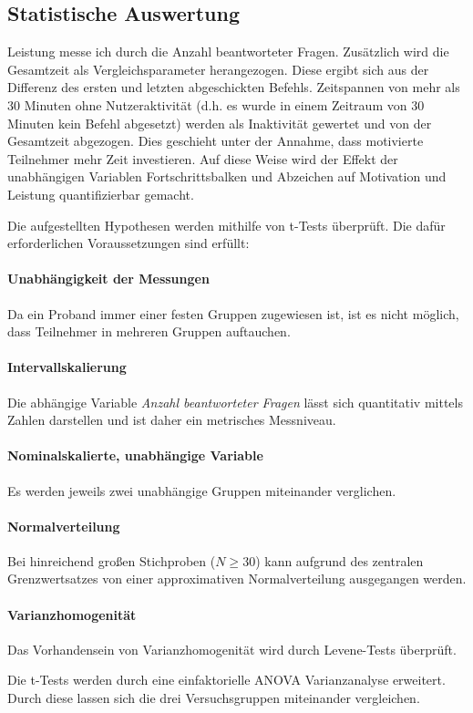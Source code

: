 \subsection{Statistische Auswertung}
Leistung messe ich durch die Anzahl beantworteter Fragen. Zusätzlich wird die Gesamtzeit als Vergleichsparameter herangezogen. Diese ergibt sich aus der Differenz des ersten und letzten abgeschickten Befehls. Zeitspannen von mehr als 30 Minuten ohne Nutzeraktivität (d.h. es wurde in einem Zeitraum von 30 Minuten kein Befehl abgesetzt) werden als Inaktivität gewertet und von der Gesamtzeit abgezogen. Dies geschieht unter der Annahme, dass motivierte Teilnehmer mehr Zeit investieren. Auf diese Weise wird der Effekt der unabhängigen Variablen Fortschrittsbalken und Abzeichen auf Motivation und Leistung quantifizierbar gemacht.

Die aufgestellten Hypothesen werden mithilfe von t-Tests überprüft. Die dafür erforderlichen Voraussetzungen sind erfüllt:

\paragraph{Unabhängigkeit der Messungen}
Da ein Proband immer einer festen Gruppen zugewiesen ist, ist es nicht möglich, dass Teilnehmer in mehreren Gruppen auftauchen.

\paragraph{Intervallskalierung}
Die abhängige Variable \textit{Anzahl beantworteter Fragen} lässt sich quantitativ mittels Zahlen darstellen und ist daher ein metrisches Messniveau.

\paragraph{Nominalskalierte, unabhängige Variable}
Es werden jeweils zwei unabhängige Gruppen miteinander verglichen.

\paragraph{Normalverteilung}
Bei  hinreichend  großen  Stichproben ($N \geq 30$)  kann  aufgrund  des  zentralen  Grenzwertsatzes  von  einer  approximativen Normalverteilung ausgegangen werden.

\paragraph{Varianzhomogenität}
Das Vorhandensein von Varianzhomogenität wird durch Levene-Tests überprüft.

Die t-Tests werden durch eine einfaktorielle ANOVA Varianzanalyse erweitert. Durch diese lassen sich die drei Versuchsgruppen miteinander vergleichen.